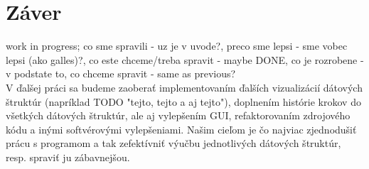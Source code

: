 \section{Záver}
work in progress; co sme spravili - uz je v uvode?, preco sme lepsi - sme vobec lepsi (ako galles)?, co este chceme/treba spravit - maybe DONE, co je rozrobene - v podstate to, co chceme spravit - same as previous?
\\
V ďalšej práci sa budeme zaoberať implementovaním ďalších vizualizácií dátových
štruktúr (napríklad TODO "tejto, tejto a aj tejto"), doplnením histórie krokov do
všetkých dátových štruktúr, ale aj vylepšením GUI, refaktorovaním zdrojového
kódu a inými softvérovými vylepšeniami. Našim cieľom je čo najviac zjednodušiť
prácu s programom a tak zefektívniť výučbu jednotlivých dátových štruktúr, resp.
spraviť ju zábavnejšou.

